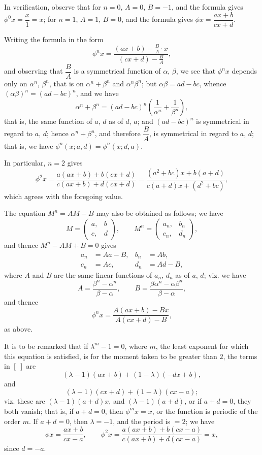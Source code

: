 \documentclass[12pt,a4paper]{article}
\begin{document}
In verification, observe that for $n=0$, $A=0$, $B=-1$, and the formula gives
$\phi^0 x = \dfrac{x}{1} = x$; for $n=1$, $A=1$, $B=0$, and the formula gives
$\phi x = \dfrac{ax+b}{cx+d}$.

Writing the formula in the form
%
\[
\phi^n x = \frac{(ax+b) - \frac{B}{A} \cdot x}{(cx+d) - \frac{B}{A}},
\]
%
and observing that $\dfrac{B}{A}$ is a symmetrical function of $\alpha$, $\beta$, we see that
$\phi^n x$ depends only on $\alpha^n$, $\beta^n$, that is on $\alpha^n + \beta^n$ and $\alpha^n \beta^n$;
but $\alpha\beta = ad-bc$, whence $(\alpha\beta)^n = (ad-bc)^n$, and we have
%
\[
\alpha^n + \beta^n = (ad-bc)^n \left(\frac{1}{\alpha^n} + \frac{1}{\beta^n}\right),
\]
%
that is, the same function of $a$, $d$ as of $d$, $a$; and $(ad-bc)^n$ is symmetrical
in regard to $a$, $d$; hence $\alpha^n + \beta^n$, and therefore $\dfrac{B}{A}$, is symmetrical in
regard to $a$, $d$; that is, we have $\phi^n(x;a,d) = \phi^n(x;d,a)$.

In particular, $n=2$ gives
%
\[
\phi^2 x = \frac{a(ax+b) + b(cx+d)}{c(ax+b) + d(cx+d)}
= \frac{(a^2+bc)x + b(a+d)}{c(a+d)x + (d^2+bc)},
\]
%
which agrees with the foregoing value.

The equation $M^n = AM - B$ may also be obtained as follows; we have
%
\[
M = \left(\begin{array}{c|c} a, & b \\ \hline c, & d \end{array}\right),
\qquad
M^n = \left(\begin{array}{c|c} a_n, & b_n \\ \hline c_n, & d_n \end{array}\right),
\]
%
and thence $M^n - AM + B = 0$ gives
\begin{align*}
a_n &= Aa - B, & b_n &= Ab, \\
c_n &= Ac, & d_n &= Ad - B,
\end{align*}
%
where $A$ and $B$ are the same linear functions of $a_n$, $d_n$ as of $a$, $d$;
viz. we have
%
\[
A = \frac{\beta^n - \alpha^n}{\beta - \alpha}, \qquad
B = \frac{\beta\alpha^n - \alpha\beta^n}{\beta - \alpha},
\]
%
and thence
%
\[
\phi^n x = \frac{A(ax+b) - Bx}{A(cx+d) - B},
\]
%
as above.

It is to be remarked that if $\lambda^m - 1 = 0$, where $m$, the least exponent for
which this equation is satisfied, is for the moment taken to be greater than $2$,
the terms in $[\;]$ are
%
\[
(\lambda-1)(ax+b) + (1-\lambda)(-dx+b),
\]
and
%
\[
(\lambda-1)(cx+d) + (1-\lambda)(cx-a);
\]
viz. these are $(\lambda-1)(a+d)x$, and $(\lambda-1)(a+d)$, or if $a+d = 0$, they
both vanish; that is, if $a+d = 0$, then $\phi^m x = x$, or the function is periodic
of the order $m$. If $a+d = 0$, then $\lambda = -1$, and the period is $=2$; we have
%
\[
\phi x = \frac{ax+b}{cx-a},
\qquad
\phi^2 x = \frac{a(ax+b) + b(cx-a)}{c(ax+b) + d(cx-a)} = x,
\]
%
since $d = -a$.
\end{document}
